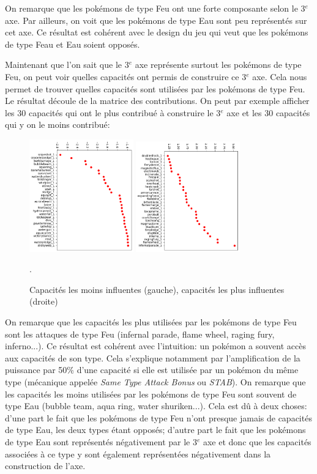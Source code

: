 \documentclass[a4paper,12pt]{article}
\begin{document}
On remarque que les pokémons de type Feu ont une forte composante selon le
3$^{e}$ axe. Par ailleurs, on voit que les pokémons de type Eau sont peu
représentés sur cet axe. Ce résultat est cohérent avec le design du jeu qui veut
que les pokémons de type Feau et Eau soient opposés. 

Maintenant que l'on sait que le 3$^{e}$ axe représente surtout les pokémons de
type Feu, on peut voir quelles capacités ont permis de construire ce 3$^{e}$
axe. Cela nous permet de trouver quelles capacités sont utilisées par les
pokémons de type Feu. Le résultat découle de la matrice des contributions. On
peut par exemple afficher les 30 capacités qui ont le plus contribué à
construire le 3$^{e}$ axe et les 30 capacités qui y on le moins contribué:
\begin{figure}[!h]
    \centering
    \includegraphics[width=0.4\textwidth]{bottom_attaques_MCA.png}
    \includegraphics[width=0.4\textwidth]{top_attaques_MCA.png}
    \caption{Capacités les moins influentes (gauche), capacités les plus
    influentes (droite)}.
    \label{fig:image3}
\end{figure}

On remarque que les capacités les plus utilisées par les pokémons de type Feu
sont les attaques de type Feu (infernal parade, flame wheel, raging fury,
inferno...). Ce résultat est cohérent avec l'intuition: un pokémon a souvent
accès aux capacités de son type. Cela s'explique notamment par l'amplification
de la puissance par 50\% d'une capacité si elle est utilisée par un pokémon du
même type (mécanique appelée \textit{Same Type Attack Bonus} ou \textit{STAB}).
On remarque que les capacités les moins utilisées par les pokémons de type Feu
sont souvent de type Eau (bubble team, aqua ring, water shuriken...). Cela est
dû à deux choses: d'une part le fait que les pokémons de type Feu n'ont presque
jamais de capacités de type Eau, les deux types étant opposés; d'autre part le
fait que les pokémons de type Eau sont représentés négativement par le 3$^{e}$
axe et donc que les capacités associées à ce type y sont également représentées
négativement dans la construction de l'axe.
\end{document}
